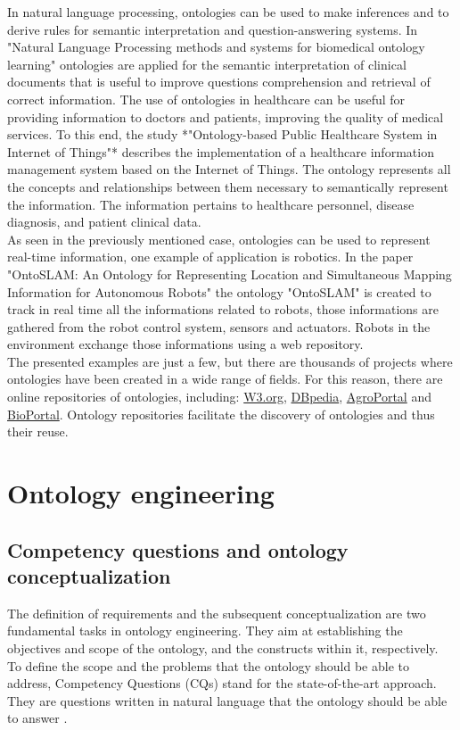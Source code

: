 In natural language processing, ontologies can be used to make inferences and to derive rules for semantic interpretation and question-answering systems. In "Natural Language Processing methods and systems for biomedical ontology learning" \cite{liu2011natural} ontologies are applied for the semantic interpretation of clinical documents that is useful to improve questions comprehension and retrieval of correct information.
The use of ontologies in healthcare can be useful for providing information to doctors and patients, improving the quality of medical services. To this end, the study *"Ontology-based Public Healthcare System in Internet of Things"* \cite{kumar2015ontology} describes the implementation of a healthcare information management system based on the Internet of Things. The ontology represents all the concepts and relationships between them necessary to semantically represent the information. The information pertains to healthcare personnel, disease diagnosis, and patient clinical data.\\
As seen in the previously mentioned case, ontologies can be used to represent real-time information, one example of application is robotics. In the paper "OntoSLAM: An Ontology for Representing Location and Simultaneous Mapping Information for Autonomous Robots" \cite{cornejo2021ontoslam} the ontology "OntoSLAM" is created to track in real time all the informations related to robots, those informations are gathered from the robot control system, sensors and actuators. Robots in the environment exchange those informations using a web repository.\\
The presented examples are just a few, but there are thousands of projects where ontologies have been created in a wide range of fields.
For this reason, there are online repositories of ontologies, including: \href{https://www.w3.org/wiki/Lists_of_ontologies}{W3.org}, \href{https://archivo.dbpedia.org/list}{DBpedia}, \href{https://agroportal.lirmm.fr/ontologies?search=o}{AgroPortal} and \href{https://bioportal.bioontology.org/ontologies}{BioPortal}.
Ontology repositories facilitate the discovery of ontologies and thus their reuse.

\section{Ontology engineering}
\label{section:2_2_ontology_engineering}
\subsection{Competency questions and ontology conceptualization}
The definition of requirements and the subsequent conceptualization are two fundamental tasks in ontology engineering.
They aim at establishing the objectives and scope of the ontology, and the constructs within it, respectively.
To define the scope and the problems that the ontology should be able to address, Competency Questions (CQs) stand for the state-of-the-art approach.
They are questions written in natural language that the ontology should be able to answer \cite{malheiros2013method}.


